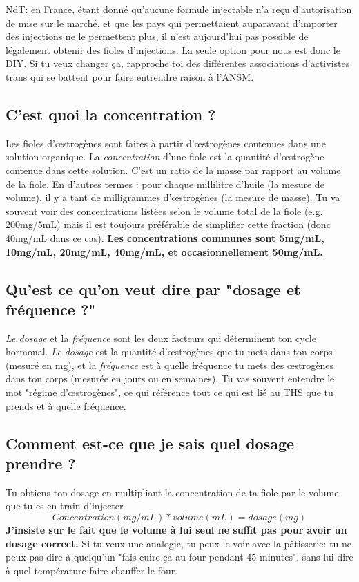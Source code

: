 \documentclass{article}
\begin{document}
NdT: en France, étant donné qu'aucune formule injectable n'a reçu d'autorisation de mise sur le marché, et que les pays qui permettaient auparavant d'importer des injections ne le permettent plus, il n'est aujourd'hui pas possible de légalement obtenir des fioles d'injections. La seule option pour nous est donc le DIY. Si tu veux changer ça, rapproche toi des différentes associations d'activistes trans qui se battent pour faire entrendre raison à l'ANSM.

\subsection{C'est quoi la concentration ?}

Les fioles d'œstrogènes sont faites à partir d'œstrogènes contenues dans une solution organique. La \textit{concentration} d'une fiole est la quantité d'œstrogène contenue dans cette solution. C'est un ratio de la masse par rapport au volume de la fiole. En d'autres termes : pour chaque millilitre d'huile (la mesure de volume), il y a tant de milligrammes d'œstrogènes (la mesure de masse). Tu va souvent voir des concentrations listées selon le volume total de la fiole (e.g. 200mg/5mL) mais il est toujours préférable de simplifier cette fraction (donc 40mg/mL dans ce cas). \textbf{Les concentrations communes sont 5mg/mL, 10mg/mL, 20mg/mL, 40mg/mL, et occasionnellement 50mg/mL.}

\subsection{Qu'est ce qu'on veut dire par "dosage et fréquence ?"}

\textit{Le dosage} et la \textit{fréquence} sont les deux facteurs qui déterminent ton cycle hormonal. \textit{Le dosage} est la quantité d'œstrogènes que tu mets dans ton corps (mesuré en mg), et la \textit{fréquence} est à quelle fréquence tu mets des œstrogènes dans ton corps (mesurée en jours ou en semaines). Tu vas souvent entendre le mot "régime d'œstrogènes", ce qui référence tout ce qui est lié au THS que tu prends et à quelle fréquence.

\subsection{Comment est-ce que je sais quel dosage prendre ?}

Tu obtiens ton dosage en multipliant la concentration de ta fiole par le volume que tu es en train d'injecter \[Concentration (mg/mL) * volume (mL) = dosage (mg)\] \textbf{J'insiste sur le fait que le volume à lui seul ne suffit pas pour avoir un dosage correct.} Si tu veux une analogie, tu peux le voir avec la pâtisserie: tu ne peux pas dire à quelqu'un "fais cuire ça au four pendant 45 minutes", sans lui dire à quel température faire chauffer le four.
\end{document}
